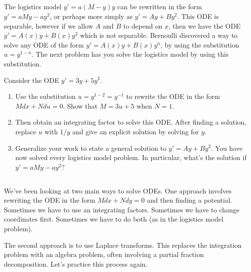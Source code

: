 \subsection*{\ideaD}
The logistics model $y'=a(M-y)y$ can be rewritten in the form $y'=aMy-ay^2$, or perhaps more simply as $y'=Ay+By^2$.  
%
This ODE is separable, however if we allow $A$ and $B$ to depend on $x$, then we have the ODE $y'=A(x)y+B(x)y^2$ which is not separable.  Bernoulli discovered a way to solve any ODE of the form $y'=A(x)y+B(x)y^n$, by using the substitution $u=y^{1-n}$. 
The next problem has you solve the logistics model by using this substitution.
\begin{problem}
 Consider the ODE $y'=3y+5y^2$.  
\begin{enumerate}
 \item 
{}%
Use the substitution $u=y^{1-2} = y^{-1}$ to rewrite the ODE in the form $Mdx+Ndu=0$. Show that $M=3u+5$ when $N=1$.
 \item Then obtain an integrating factor to solve this ODE. After finding a solution, replace $u$ with $1/y$ and give an explicit solution by solving for $y$.
 \item Generalize your work to state a general solution to $y'=Ay+By^2$. You have now solved every logistics model problem. In particular, what's the solution if $y'=aMy-ay^2$?
\end{enumerate}
\end{problem}




\subsection*{\ideaC}
We've been looking at two main ways to solve ODEs.  One approach involves rewriting the ODE in the form $Mdx+Ndy=0$ and then finding a potential.  Sometimes we have to use an integrating factors.  Sometimes we have to change coordinates first.  Sometimes we have to do both (as in the logistics model problem).  

The second approach is to use Laplace transforms. This replaces the integration problem with an algebra problem, often involving a partial fraction decomposition. Let's practice this process again.

